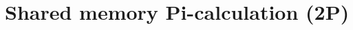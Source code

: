 \documentclass[article]{scrartcl}
\begin{document}
\maketitle
\thispagestyle{fancy}

%
%

\section{Shared memory Pi-calculation (2P)}
\end{document}
